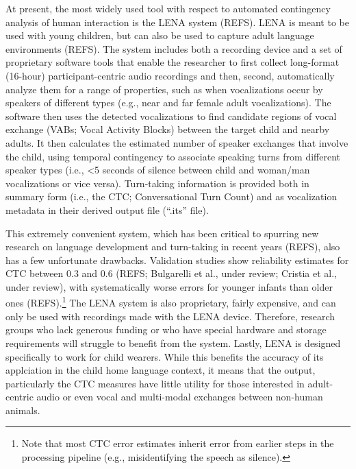 \documentclass[10pt, letterpaper]{article}
\begin{document}
At present, the most widely used tool with respect to automated
contingency analysis of human interaction is the LENA system (REFS).
LENA is meant to be used with young children, but can also be used to
capture adult language environments (REFS). The system includes both a
recording device and a set of proprietary software tools that enable the
researcher to first collect long-format (16-hour) participant-centric
audio recordings and then, second, automatically analyze them for a
range of properties, such as when vocalizations occur by speakers of
different types (e.g., near and far female adult vocalizations). The
software then uses the detected vocalizations to find candidate regions
of vocal exchange (VABs; Vocal Activity Blocks) between the target child
and nearby adults. It then calculates the estimated number of speaker
exchanges that involve the child, using temporal contingency to
associate speaking turns from different speaker types (i.e., \textless5
seconds of silence between child and woman/man vocalizations or vice
versa). Turn-taking information is provided both in summary form (i.e.,
the CTC; Conversational Turn Count) and as vocalization metadata in
their derived output file (``.its'' file).

This extremely convenient system, which has been critical to spurring
new research on language development and turn-taking in recent years
(REFS), also has a few unfortunate drawbacks. Validation studies show
reliability estimates for CTC between 0.3 and 0.6 (REFS; Bulgarelli et
al., under review; Cristia et al., under review), with systematically
worse errors for younger infants than older ones (REFS).\footnote{Note
  that most CTC error estimates inherit error from earlier steps in the
  processing pipeline (e.g., misidentifying the speech as silence).} The
LENA system is also proprietary, fairly expensive, and can only be used
with recordings made with the LENA device. Therefore, research groups
who lack generous funding or who have special hardware and storage
requirements will struggle to benefit from the system. Lastly, LENA is
designed specifically to work for child wearers. While this benefits the
accuracy of its applciation in the child home language context, it means
that the output, particularly the CTC measures have little utility for
those interested in adult-centric audio or even vocal and multi-modal
exchanges between non-human animals.
\end{document}
